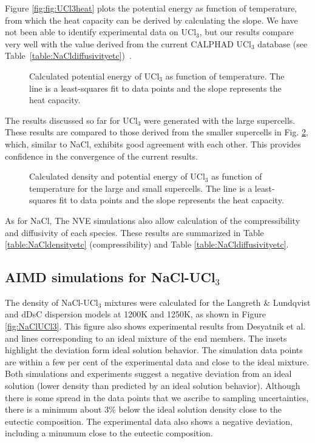 \documentclass[preprint,3p,10pt,twocolumn,number,sort&compress]{elsarticle}
\begin{document}
Figure \ref{fig:fig:UCl3heat} plots the potential energy as function of temperature, from which the heat capacity can be derived by calculating the slope. We have not been able to identify experimental data on UCl$_3$, but our results compare very well with the value derived from the current CALPHAD UCl$_3$ database (see Table~\ref{table:NaCldiffusivityetc})~\cite{}.

\begin{figure}[htb]
\centering
\caption{Calculated potential energy of UCl$_3$ as function of temperature. The line is a least-squares fit to data points and the slope represents the heat capacity.} 
\label{fig:UCl3heat}
\end{figure}

The results discussed so far for UCl$_3$ were generated with the large supercells. These results are compared to those derived from the smaller supercells in Fig. \ref{fig:UCl3size}, which, similar to NaCl, exhibits good agreement with each other. This provides confidence in the convergence of the current results.

\begin{figure}[htb]
\centering
\caption{Calculated density and potential energy of UCl$_3$ as function of temperature for the large and small supercells. The line is a least-squares fit to data points and the slope represents the heat capacity.} 
\label{fig:UCl3size}
\end{figure}

As for NaCl, The NVE simulations also allow calculation of the compressibility and diffusivity of each species. These results are  summarized in Table \ref{table:NaCldensityetc} (compressibility) and Table \ref{table:NaCldiffusivityetc}.
 
\subsection{AIMD simulations for NaCl-UCl$_3$}
The density of NaCl-UCl$_3$ mixtures were calculated for the Langreth \& Lundqvist and dDsC dispersion models at 1200K and 1250K, as shown in Figure \ref{fig:NaClUCl3}. This figure also shows experimental results from Desyatnik et al.~\cite{} and lines corresponding to an ideal mixture of the end members. The insets highlight the deviation form ideal solution behavior. The simulation data points are within a few per cent of the experimental data and close to the ideal mixture. Both simulations and experiments suggest a negative deviation from an ideal solution (lower density than predicted by an ideal solution behavior). Although there is some spread in the data points that we ascribe to sampling uncertainties, there is a minimum about 3\% below the ideal solution density close to the eutectic composition. The experimental data also shows a negative deviation, including a minumum close to the eutectic composition.  
\end{document}

